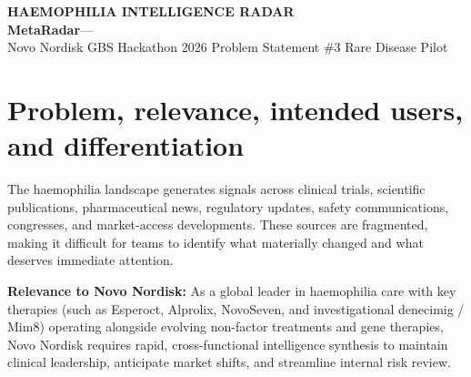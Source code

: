 \documentclass[10pt,a4paper]{article}
\begin{document}
\RaggedRight
\fontsize{7.4pt}{9.0pt}\selectfont

\begin{center}
{\fontsize{16}{17}\selectfont\bfseries\color{Navy}HAEMOPHILIA INTELLIGENCE RADAR}\\[1pt]
{\fontsize{8.5}{9.5}\selectfont\color{Blue}\bfseries MetaRadar}\quad\textcolor{Muted}{---}\\[2.5pt]
{\fontsize{6.8}{7.6}\selectfont Novo Nordisk GBS Hackathon 2026 \textbar{} Problem Statement \#3 \textbar{} Rare Disease Pilot}
\end{center}
\vspace{-3pt}
\par{}

\section{Problem, relevance, intended users, and differentiation}
The haemophilia landscape generates signals across clinical trials, scientific publications, pharmaceutical news, regulatory updates, safety communications, congresses, and market-access developments. These sources are fragmented, making it difficult for teams to identify what materially changed and what deserves immediate attention.

\textbf{Relevance to Novo Nordisk:} As a global leader in haemophilia care with key therapies (such as Esperoct, Alprolix, NovoSeven, and investigational denecimig / Mim8) operating alongside evolving non-factor treatments and gene therapies, Novo Nordisk requires rapid, cross-functional intelligence synthesis to maintain clinical leadership, anticipate market shifts, and streamline internal risk review.
\end{document}
